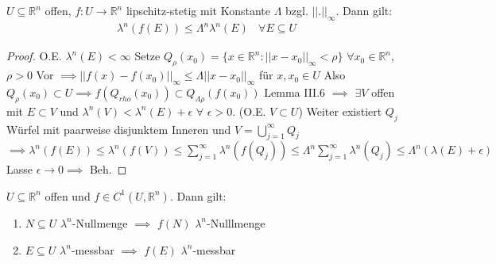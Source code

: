   \begin{lemma}
    $U \subseteq \mathbb{R}^n$ offen, $f: U \to \mathbb{R}^n$ lipschitz-stetig mit Konstante $\Lambda$ bzgl. $||.||_{\infty}$. Dann gilt:
    \begin{align*}
      \lambda^n(f(E)) \leq \Lambda^n \lambda^n(E) \ \ \ \ \forall E \subseteq U
    \end{align*}
  \end{lemma}

    \begin{proof}
	O.E. $\lambda^n(E) < \infty$ \newline
	Setze $Q_{\rho}(x_0) = \{x\in\mathbb{R}^n: ||x-x_0||_{\infty} < \rho\}$ $\forall x_0\in\mathbb{R}^n$, $\rho >0$ \newline
	Vor $\implies ||f(x)-f(x_0)||_{\infty} \leq \Lambda ||x-x_0||_{\infty}$ für $x,x_0\in U$ \newline
	Also $Q_{\rho}(x_0) \subset U \implies f(Q_{rho}(x_0)) \subset Q_{\Lambda \rho}(f(x_0))$ \newline
	Lemma III.6 $\implies$ $\exists V$ offen mit $E\subset V$ und $\lambda^n(V) < \lambda^n(E) + \epsilon$ $\forall$ $\epsilon >0$. \newline
	(O.E. $V\subset U$) \newline 
	Weiter existiert $Q_j$ Würfel mit paarweise disjunktem Inneren und $V = \bigcup\limits_{j=1}^{\infty}Q_j$ \newline
	$\implies \lambda^n(f(E)) \leq \lambda^n(f(V)) \leq \sum\limits_{j=1}^{\infty}\lambda^n(f(Q_j)) \leq \Lambda^n \sum\limits_{j=1}^{\infty}\lambda^n(Q_j) \leq \Lambda^n(\lambda(E)+\epsilon)$ \newline
	Lasse $\epsilon\to 0 \implies$ Beh. 
\end{proof}

  \begin{theorem}
    $U \subseteq \mathbb{R}^n$ offen und $f \in C^1(U, \mathbb{R}^n)$. Dann gilt:
    \begin{enumerate}
      \item $N \subseteq U$ $\lambda^n$-Nullmenge $\implies$ $f(N)$ $\lambda^n$-Nulllmenge
      \item $E \subseteq U$ $\lambda^n$-messbar $\implies$ $f(E)$ $\lambda^n$-messbar
    \end{enumerate}
  \end{theorem}

